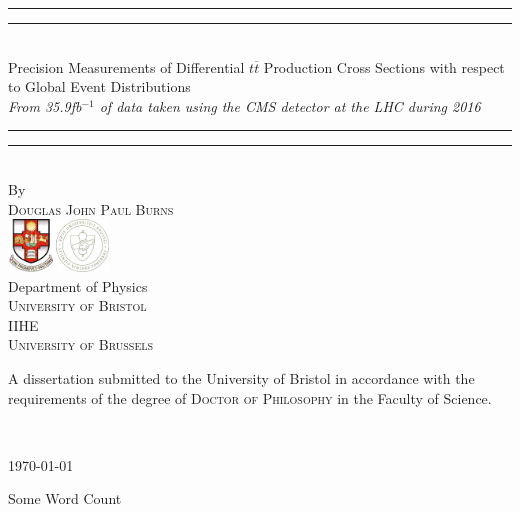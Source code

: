 \begin{titlepage}
\vspace*{13mm}
\begin{center}
\rule[0.5ex]{\linewidth}{2pt}\vspace*{-\baselineskip}\vspace*{3.2pt}
\rule[0.5ex]{\linewidth}{1pt}\\[\baselineskip]
{\Huge Precision Measurements of Differential $t\overline{t}$ Production Cross Sections with respect to Global Event Distributions}\\[4mm]
{\Large \textit{From 35.9fb$^{-1}$ of data taken using the CMS detector at the LHC during 2016}}\\
\rule[0.5ex]{\linewidth}{1pt}\vspace*{-\baselineskip}\vspace{3.2pt}
\rule[0.5ex]{\linewidth}{2pt}\\
\vspace{6.5mm}
{\large By}\\
\vspace{6.5mm}
{\large\textsc{Douglas John Paul Burns}}\\
\vspace{11mm}
\includegraphics[width=0.2\textwidth]{Figures/Uni_Logo} \\
\vspace{6mm}
{\large Department of Physics\\
\vspace{1mm}
\textsc{University of Bristol}}\\
\vspace{3mm}
{\large IIHE\\
\vspace{1mm}
\textsc{University of Brussels}}\\
\vspace{11mm}
\begin{minipage}{10cm}
A dissertation submitted to the University of Bristol in accordance with the requirements of the degree of \textsc{Doctor of Philosophy} in the Faculty of Science.
\end{minipage}\\
\vspace{9mm}
{\large \today\par}
\vspace{12mm}
\end{center}
\begin{flushright}
{\small Some Word Count}
\end{flushright}
\end{titlepage}

